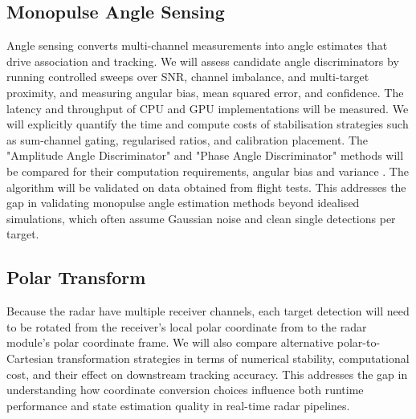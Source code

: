 %     

\subsection{Monopulse Angle Sensing}
Angle sensing converts multi-channel measurements into angle estimates that drive association and tracking. We will assess candidate angle discriminators by running controlled sweeps over SNR, channel imbalance, and multi-target proximity, and measuring angular bias, mean squared error, and confidence. The latency and throughput of CPU and GPU implementations will be measured. We will explicitly quantify the time and compute costs of stabilisation strategies such as sum-channel gating, regularised ratios, and calibration placement. The "Amplitude Angle Discriminator" and "Phase Angle Discriminator" methods will be compared for their computation requirements, angular bias and variance \cite{mitll_radar_lecture9_tracking_2008}. The algorithm will be validated on data obtained from flight tests. This addresses the gap in validating monopulse angle estimation methods beyond idealised simulations, which often assume Gaussian noise and clean single detections per target.  

\subsection{Polar Transform}
Because the radar have multiple receiver channels, each target detection will need to be rotated from the receiver's local polar coordinate from to the radar module's polar coordinate frame. We will also compare alternative polar-to-Cartesian transformation strategies in terms of numerical stability, computational cost, and their effect on downstream tracking accuracy. This addresses the gap in understanding how coordinate conversion choices influence both runtime performance and state estimation quality in real-time radar pipelines.

